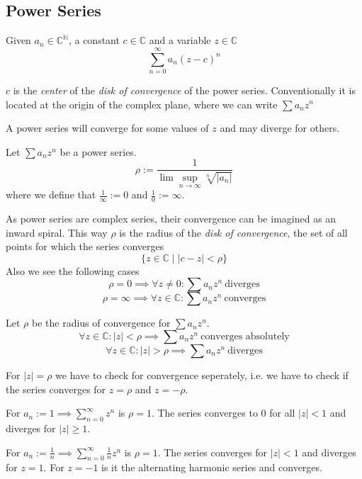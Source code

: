 \subsection{Power Series}
\begin{definition}\label{def:power_series}
   Given \(a_n \in \mathbb{C}^\mathbb{N}\), a constant \(c \in \mathbb{C}\) and a variable \(z \in \mathbb{C}\)
   \[\sum_{n=0}^\infty a_n (z - c)^n\]
\end{definition}
\begin{remark}[Terminology]
   \(c\) is the \emph{center} of the \emph{disk of convergence} of the power series.
   Conventionally it is located at the origin of the complex plane, where we can write \(\sum a_n z^n\)
\end{remark}
A power series will converge for some values of \(z\) and may diverge for others.
\begin{theorem}
   Let \(\sum a_n z^n\) be a power series.
   \[\rho := \frac{1}{\lim\sup_{n \to \infty} \sqrt[n]{|a_n|}}\]
   where we define that \(\frac{1}{\infty} := 0\) and \(\frac{1}{0} := \infty\).
\end{theorem}
\begin{remark}[Intuition]
   As power series are complex series, their convergence can be imagined as an inward spiral.
   This way \(\rho\) is the radius of the \emph{disk of convergence}, the set of all points for which the series converges
   \[\{z \in \mathbb{C} \mid |c - z| < \rho\}\]
   Also we see the following cases
   \[\rho = 0 \implies \forall z \neq 0: \sum a_n z^n~\text{diverges}\]
   \[\rho = \infty \implies \forall z \in \mathbb{C}: \sum a_n z^n~\text{converges}\]
\end{remark}

%    

\begin{theorem}\label{thm:conv_radius}
   Let \(\rho\) be the radius of convergence for \(\sum a_n z^n\).
   \[\forall z \in \mathbb{C}: \lvert z\rvert < \rho \implies \sum a_n z^n~\text{converges absolutely}\]
   \[\forall z \in \mathbb{C}: \lvert z\rvert > \rho \implies \sum a_n z^n~\text{diverges}\]
\end{theorem}
\begin{remark}
   For \(\lvert z\rvert = \rho\) we have to check for convergence seperately, i.e. we have to check if the series converges for \(z = \rho\) and \(z = -\rho\).
\end{remark}
\begin{example}
   For \(a_n := 1 \implies \sum_{n=0}^\infty z^n\) is \(\rho = 1\).
   The series converges to 0 for all \(|z| < 1\) and diverges for \(|z| \geq 1\).
\end{example}
\begin{example}
   For \(a_n := \frac{1}{n} \implies \sum_{n=0}^\infty \frac{1}{n} z^n\) is \(\rho = 1\).
   The series converges for \(|z| < 1\) and diverges for \(z = 1\).
   For \(z = -1\) is it the alternating harmonic series and converges.
\end{example}


